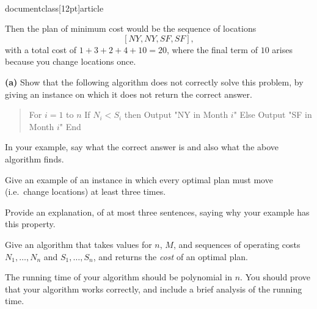 \\documentclass[12pt]{article}
\begin{document}
\begin{enumerate}
Then the plan of minimum cost would be the sequence of locations
$$[NY, NY, SF, SF],$$
with a total cost of
$1 + 3 + 2 + 4 + 10 = 20$, where the final term
of $10$ arises because you change locations once.

\bigskip
{\bf (a)}  Show that the following algorithm does not
correctly solve this problem, by giving an instance on which
it does not return the correct answer.
\begin{quote}
\begin{code}
For $i = 1$ to $n$
  If $N_i < S_i$ then
    Output "NY in Month $i$"
  Else
    Output "SF in Month $i$"
End
\end{code}
\end{quote}
In your example, say what the correct answer is and
also what the above algorithm finds.

Give an example of an instance in which every optimal plan
must move (i.e.~change locations) at least three times.

Provide an explanation, of at most three sentences, saying
why your example has this property.

Give an algorithm that takes values for $n$, $M$,
and sequences of operating costs
$N_1, \ldots, N_n$ and $S_1, \ldots, S_n$,
and returns the {\em cost} of an optimal plan.

The running time of your algorithm should be polynomial in $n$.
You should prove that your algorithm works correctly, and include a
brief analysis of the running time.

\end{enumerate}
\end{document}
